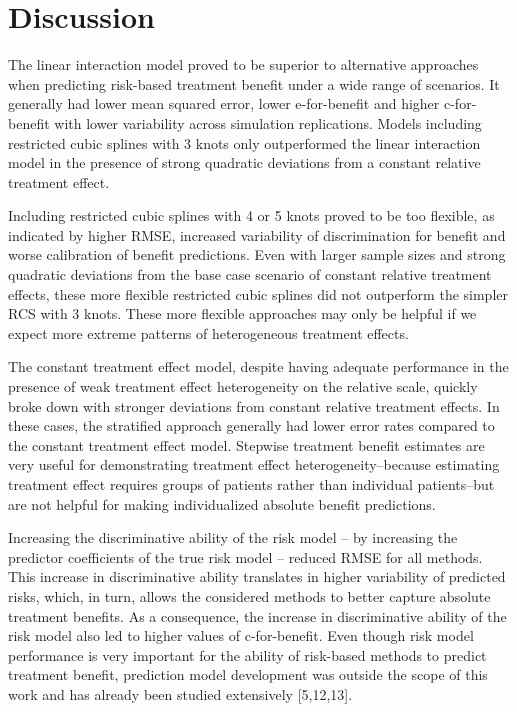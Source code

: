 \documentclass{article}
\begin{document}
\hypertarget{discussion}{%
\section{Discussion}\label{discussion}}

The linear interaction model proved to be superior to alternative
approaches when predicting risk-based treatment benefit under a wide
range of scenarios. It generally had lower mean squared error, lower
e-for-benefit and higher c-for-benefit with lower variability across
simulation replications. Models including restricted cubic splines with
3 knots only outperformed the linear interaction model in the presence
of strong quadratic deviations from a constant relative treatment
effect.

Including restricted cubic splines with 4 or 5 knots proved to be too
flexible, as indicated by higher RMSE, increased variability of
discrimination for benefit and worse calibration of benefit predictions.
Even with larger sample sizes and strong quadratic deviations from the
base case scenario of constant relative treatment effects, these more
flexible restricted cubic splines did not outperform the simpler RCS
with 3 knots. These more flexible approaches may only be helpful if we
expect more extreme patterns of heterogeneous treatment effects.

The constant treatment effect model, despite having adequate performance
in the presence of weak treatment effect heterogeneity on the relative
scale, quickly broke down with stronger deviations from constant
relative treatment effects. In these cases, the stratified approach
generally had lower error rates compared to the constant treatment
effect model. Stepwise treatment benefit estimates are very useful for
demonstrating treatment effect heterogeneity--because estimating
treatment effect requires groups of patients rather than individual
patients--but are not helpful for making individualized absolute benefit
predictions.

Increasing the discriminative ability of the risk model -- by increasing
the predictor coefficients of the true risk model -- reduced RMSE for
all methods. This increase in discriminative ability translates in
higher variability of predicted risks, which, in turn, allows the
considered methods to better capture absolute treatment benefits. As a
consequence, the increase in discriminative ability of the risk model
also led to higher values of c-for-benefit. Even though risk model
performance is very important for the ability of risk-based methods to
predict treatment benefit, prediction model development was outside the
scope of this work and has already been studied extensively
{[}5,12,13{]}.
\end{document}
